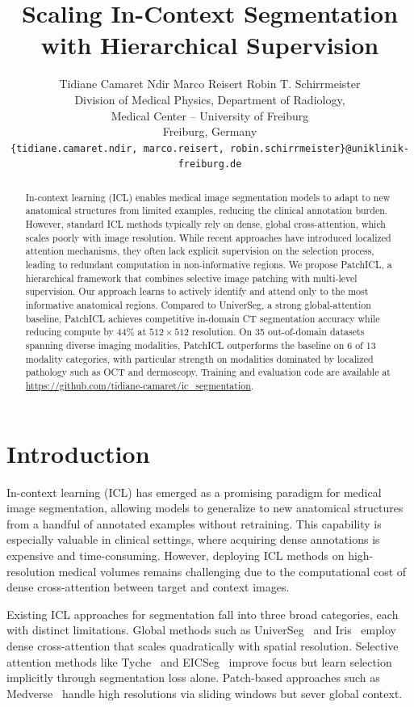 \documentclass[10pt,twocolumn,letterpaper]{article}
\title{Scaling In-Context Segmentation with Hierarchical Supervision}
\author{Tidiane Camaret Ndir \qquad Marco Reisert \qquad Robin T. Schirrmeister\\
Division of Medical Physics, Department of Radiology,\\
Medical Center – University of Freiburg\\
Freiburg, Germany\\
{\tt\small \{tidiane.camaret.ndir, marco.reisert, robin.schirrmeister\}@uniklinik-freiburg.de}
}
\begin{document}
\maketitle

\begin{abstract}
In-context learning (ICL) enables medical image segmentation models to adapt to new anatomical structures from limited examples, reducing the clinical annotation burden. However, standard ICL methods typically rely on dense, global cross-attention, which scales poorly with image resolution. While recent approaches have introduced localized attention mechanisms, they often lack explicit supervision on the selection process, leading to redundant computation in non-informative regions. We propose PatchICL, a hierarchical framework that combines selective image patching with multi-level supervision. Our approach learns to actively identify and attend only to the most informative anatomical regions. Compared to UniverSeg, a strong global-attention baseline, PatchICL achieves competitive in-domain CT segmentation accuracy while reducing compute by 44\% at $512\times512$ resolution. On 35 out-of-domain datasets spanning diverse imaging modalities, PatchICL outperforms the baseline on 6 of 13 modality categories, with particular strength on modalities dominated by localized pathology such as OCT and dermoscopy. Training and evaluation code are available at \url{https://github.com/tidiane-camaret/ic_segmentation}.
\end{abstract}

\section{Introduction}
\label{sec:intro}

In-context learning (ICL) has emerged as a promising paradigm for medical image segmentation, allowing models to generalize to new anatomical structures from a handful of annotated examples without retraining. This capability is especially valuable in clinical settings, where acquiring dense annotations is expensive and time-consuming. However, deploying ICL methods on high-resolution medical volumes remains challenging due to the computational cost of dense cross-attention between target and context images.

Existing ICL approaches for segmentation fall into three broad categories, each with distinct limitations. Global methods such as UniverSeg~\cite{butoiUniverSegUniversalMedical2023} and Iris~\cite{gaoShowSegmentUniversal2025} employ dense cross-attention that scales quadratically with spatial resolution. Selective attention methods like Tyche~\cite{rakicTycheStochasticInContext2025} and EICSeg~\cite{xieEICSegUniversalMedical2026} improve focus but learn selection implicitly through segmentation loss alone. Patch-based approaches such as Medverse~\cite{huMedverseUniversalModel2025a} handle high resolutions via sliding windows but sever global context.
\end{document}
